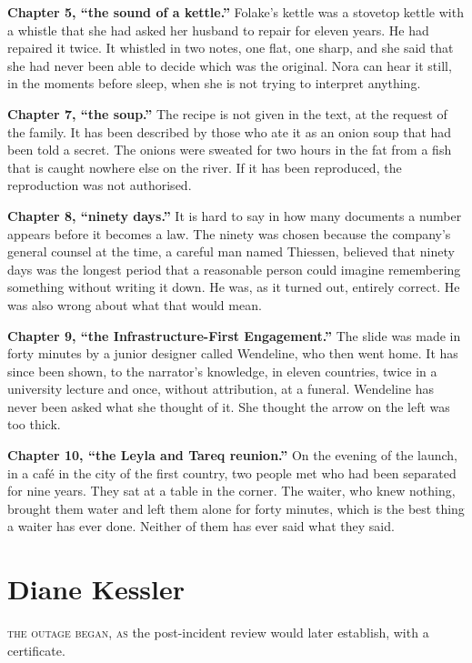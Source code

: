 {\textbf{Chapter 5, ``the sound of a kettle.''} Folake's kettle was a stovetop kettle with a whistle that she had asked her husband to repair for eleven years. He had repaired it twice. It whistled in two notes, one flat, one sharp, and she said that she had never been able to decide which was the original. Nora can hear it still, in the moments before sleep, when she is not trying to interpret anything.

\textbf{Chapter 7, ``the soup.''} The recipe is not given in the text, at the request of the family. It has been described by those who ate it as an onion soup that had been told a secret. The onions were sweated for two hours in the fat from a fish that is caught nowhere else on the river. If it has been reproduced, the reproduction was not authorised.

\textbf{Chapter 8, ``ninety days.''} It is hard to say in how many documents a number appears before it becomes a law. The ninety was chosen because the company's general counsel at the time, a careful man named Thiessen, believed that ninety days was the longest period that a reasonable person could imagine remembering something without writing it down. He was, as it turned out, entirely correct. He was also wrong about what that would mean.

\textbf{Chapter 9, ``the Infrastructure-First Engagement.''} The slide was made in forty minutes by a junior designer called Wendeline, who then went home. It has since been shown, to the narrator's knowledge, in eleven countries, twice in a university lecture and once, without attribution, at a funeral. Wendeline has never been asked what she thought of it. She thought the arrow on the left was too thick.

\textbf{Chapter 10, ``the Leyla and Tareq reunion.''} On the evening of the launch, in a café in the city of the first country, two people met who had been separated for nine years. They sat at a table in the corner. The waiter, who knew nothing, brought them water and left them alone for forty minutes, which is the best thing a waiter has ever done. Neither of them has ever said what they said.

}

\part{Diane Kessler}


\textsc{the outage began, as} the post-incident review would later establish, with a certificate.

